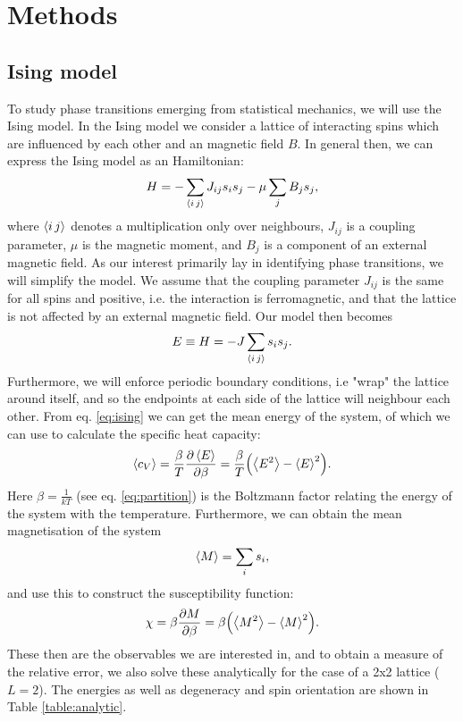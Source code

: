 \section{Methods}
\label{sec:methods}

\subsection{Ising model}
\label{sec:ising}
To study phase transitions emerging from statistical mechanics, we will use the Ising model. In the Ising model we consider a lattice of interacting spins which are influenced by each other and an magnetic field $B$. In general then, we can express the Ising model as an Hamiltonian:
  \begin{equation}
  \label{eq:isingH}
    H = -\sum_{\expval{i\, j}}J_{ij}s_i s_j - \mu\sum_j B_js_j,
  \end{equation}
where $\expval{i\,j}$ denotes a multiplication only over neighbours, $J_{ij}$ is a coupling parameter, $\mu$ is the magnetic moment, and $B_j$ is a component of an external magnetic field. As our interest primarily lay in identifying phase transitions, we will simplify the model. We assume that the coupling parameter $J_{ij}$ is the same for all spins and positive, i.e. the interaction is ferromagnetic, and that the lattice is not affected by an external magnetic field. Our model then becomes
  \begin{equation}
  \label{eq:ising}
    E \equiv H = -J\sum_{\expval{i\, j}}s_i s_j.
  \end{equation}
Furthermore, we will enforce periodic boundary conditions, i.e "wrap" the lattice around itself, and so the endpoints at each side of the lattice will neighbour each other.
From eq. \ref{eq:ising} we can get the mean energy of the system, of which we can use to calculate the specific heat capacity:
  \begin{equation}
    \label{eq:energy}
    \expval{c_V} = \frac{\beta}{T}\pdv{\expval{E}}{\beta} = \frac{\beta}{T}\qty(\expval{E^2} - \expval{E}^2).
  \end{equation}
Here $\beta = \frac{1}{kT}$ (see eq. \ref{eq:partition}) is the Boltzmann factor relating the energy of the system with the temperature. Furthermore, we can obtain the mean magnetisation of the system
  \begin{equation}
  \label{eq:magnet}
    \expval{M} = \sum_i s_i,
  \end{equation}
and use this to construct the susceptibility function:
  \begin{equation}
  \label{eq:suscept}
    \chi = \beta \pdv{M}{\beta} = \beta \qty(\expval{M^2} - \expval{M}^2).
  \end{equation}
These then are the observables we are interested in, and to obtain a measure of the relative error, we also solve these analytically for the case of a 2x2 lattice ($L=2$). The energies as well as degeneracy and spin orientation are shown in Table \ref{table:analytic}.

